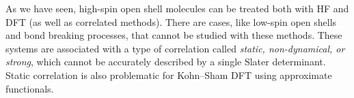 \documentclass[../Main/notes.tex]{subfiles}
\begin{document}

As we have seen, high-spin open shell molecules can be treated both with HF and DFT (as well as correlated methods).
There are cases, like low-spin open shells and bond breaking processes, that cannot be studied with these methods.
These systems are associated with a type of correlation called \emph{static, non-dynamical, or strong}, which cannot be accurately described by a single Slater determinant.
Static correlation is also problematic for Kohn--Sham DFT using approximate functionals.
\end{document}
